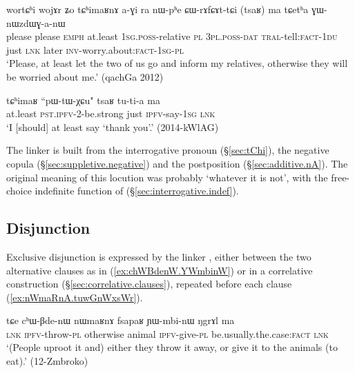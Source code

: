 \begin{exe}
\ex \label{ex:tChimaRnA.CWrAfCAttCi}
\gll wortɕʰi wojɤr ʑo tɕʰimaʁnɤ a-ɣi ra nɯ-pʰe ɕɯ-rɤfɕɤt-tɕi (tsaʁ) ma tɕetʰa ɣɯ-nɯzdɯɣ-a-nɯ \\
please please \textsc{emph} at.least \textsc{1sg}.\textsc{poss}-relative \textsc{pl} \textsc{3pl}.\textsc{poss}-\textsc{dat} \textsc{tral}-tell:\textsc{fact}-\textsc{1du} just \textsc{lnk} later \textsc{inv}-worry.about:\textsc{fact}-\textsc{1sg}-\textsc{pl} \\
\glt `Please, at least let the two of us go and inform my relatives, otherwise they will be worried about me.' (qachGa 2012)
\end{exe} 

\begin{exe}
\ex \label{ex:tChimaR.tsaR}
\gll  tɕʰimaʁ ``pɯ-tɯ-χɕu" tsaʁ tu-ti-a ma \\
at.least \textsc{pst}.\textsc{ipfv}-2-be.strong just \textsc{ipfv}-say-\textsc{1sg} \textsc{lnk} \\
\glt `I [should] at least say `thank you'.' (2014-kWlAG)
\end{exe} 

The linker  is built from the interrogative pronoun  (§\ref{sec:tChi}), the negative copula  (§\ref{sec:suppletive.negative}) and the postposition  (§\ref{sec:additive.nA}). The original meaning of this locution was probably `whatever it is not', with the free-choice indefinite function of  (§\ref{sec:interrogative.indef}).

\subsection{Disjunction} \label{sec:disjunction.clauses}
Exclusive disjunction is expressed by the linker , either between the two alternative clauses as in (\ref{ex:chWBdenW.YWmbinW}) or in a correlative construction (§\ref{sec:correlative.clauses}), repeated before each clause (\ref{ex:nWmaRnA.tuwGnWxsWr}).

\begin{exe}
\ex \label{ex:chWBdenW.YWmbinW}
\gll tɕe cʰɯ-βde-nɯ nɯmaʁnɤ fsapaʁ ɲɯ-mbi-nɯ ŋgrɤl ma \\
\textsc{lnk} \textsc{ipfv}-throw-\textsc{pl} otherwise animal \textsc{ipfv}-give-\textsc{pl} be.usually.the.case:\textsc{fact} \textsc{lnk} \\
\glt `(People uproot it and) either they throw it away, or give it to the animals (to eat).' (12-Zmbroko)
\end{exe} 

